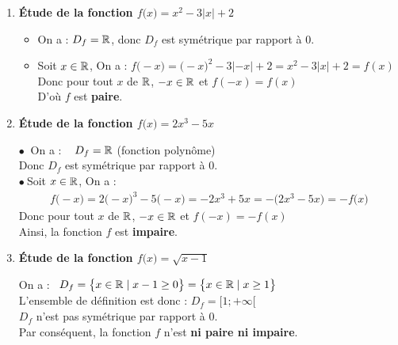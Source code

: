 \documentclass[10pt, a4paper]{article}
\begin{document}
\begin{Solution}[APPLICATION][4]
\begin{enumerate}[leftmargin=*,itemsep=0.5pt]
    \item \textbf{Étude de la fonction $f\big( x \big) = x^2 - 3|x| + 2$}

\begin{itemize}[leftmargin=*,itemsep=0.5pt]
    \item On a :  $D_f = \mathbb{R}$, donc $D_f$ est symétrique par rapport à $0$.

    \item Soit $x \in \mathbb{R}$, On a :
         $f\big( -x \big) = \big( -x \big)^2 - 3|-x| + 2
                            = x^2 - 3|x| + 2 = f(x)$ \\
    Donc pour tout $x$ de $\mathbb{R}$, $-x \in \mathbb{R}$ et $f(-x)=f(x)$ \\
    D'où $f$ est \textbf{paire}.
\end{itemize}


    \item \textbf{Étude de la fonction $f\big( x \big) = 2x^3 - 5x$}

   $\bullet~$ On a : ~ $D_f = \mathbb{R}$ \quad (fonction polynôme) \\
    Donc $D_f$ est symétrique par rapport à $0$. \\
   $\bullet~$Soit $x \in \mathbb{R}$, On a : 
    \begin{align*}
        f\big( -x \big) = 2\big( -x \big)^3 - 5\big( -x \big)
         = -2x^3 + 5x
         = -\big( 2x^3 - 5x \big) 
        = -f\big( x \big)
    \end{align*}
    Donc pour tout $x$ de $\mathbb{R}$, $-x \in \mathbb{R}$ et $f(-x)=-f(x)$ \\
    Ainsi, la fonction $f$ est \textbf{impaire}.

    \item \textbf{Étude de la fonction $f\big( x \big) = \sqrt{x - 1}$}

     On a :~ $D_f = \big\{ x \in \mathbb{R} \mid x - 1 \geq 0 \big\}=
                    \big\{ x \in \mathbb{R} \mid x  \geq 1 \big\}$ \\
    L'ensemble de définition est donc : $D_f = \big[ 1 ; +\infty \big[$ \\
    $D_f$ n'est pas symétrique par rapport à $0$. \\
    Par conséquent, la fonction $f$ n'est \textbf{ni paire ni impaire}.

\end{enumerate}
\end{Solution}
\end{document}

